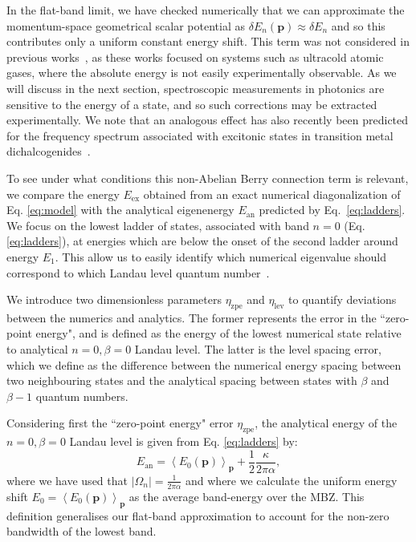 \documentclass[twocolumn, 10pt, aps, superscriptaddress, floatfix, showpacs, pra, citeautoscript]{revtex4-1}
\newcommand{\vt}[1]{\mathbf{#1}}
\begin{document}
In the flat-band limit, we have checked numerically that we can approximate the momentum-space geometrical scalar potential as $\delta E_n(\vt{p}) \approx   \delta E_n$ and so this contributes only a uniform constant energy shift. This term was not considered in previous works~\cite{price2014magnetic, ozawa2014momhh}, as these works focused on systems such as ultracold atomic gases, where the absolute energy is not easily experimentally observable. As we will discuss in the next section, spectroscopic measurements in photonics are sensitive to the energy of a state, and so such corrections may be extracted experimentally. We note that an analogous effect has also recently been predicted for the frequency spectrum associated with excitonic states in transition metal dichalcogenides~\cite{srivastava:2015}.

To see under what conditions this non-Abelian Berry connection term is relevant, we compare the energy $E_{\text{ex}}$ obtained from an exact numerical diagonalization of Eq. \ref{eq:model} with the analytical eigenenergy $  E_{\text{an}}$ predicted by Eq.~\eqref{eq:ladders}. We focus on the lowest ladder of states, associated with band $n=0$ (Eq. \ref{eq:ladders}), at energies which are below the onset of the second ladder around energy $E_1$. This allow us to easily identify which numerical eigenvalue should correspond to which Landau level quantum number~\cite{price2014magnetic}. 

We introduce two dimensionless parameters $\eta_{\text{zpe}}$ and $\eta_{\text{lev}}$ to quantify deviations between the numerics and analytics. The former represents the error in the ``zero-point energy", and is defined as the energy of the lowest numerical state relative to analytical $n=0, \beta=0$ Landau level. The latter is the level spacing error, which we define as the difference between the numerical energy spacing between two neighbouring states and the analytical spacing between states with $\beta$ and $\beta-1$ quantum numbers.  

Considering first the ``zero-point energy" error $\eta_{\text{zpe}}$, the analytical energy of the $n=0, \beta=0$ Landau level is given from Eq. \ref{eq:ladders} by:
%
\begin{equation}
  E_{\text{an}} = \left<E_0(\vt{p})\right>_{\vt{p}} + \frac{1}{2}\frac{\kappa}{2\pi\alpha} ,
\end{equation}
%
where we have used that $|\Omega_n| = \frac{1}{2\pi\alpha}$ and where we calculate the uniform energy shift $E_0=\left<E_0(\vt{p})\right>_{\vt{p}}$ as the average band-energy over the MBZ. This definition generalises our flat-band approximation to account for the non-zero bandwidth of the lowest band. 
\end{document}
